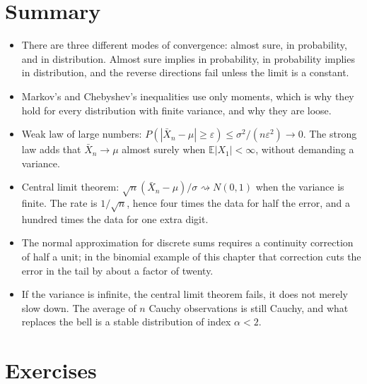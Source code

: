 \section{Summary}

\begin{ringkasan}
\begin{itemize}
  \item There are three different modes of convergence: almost sure, in probability,
        and in distribution. Almost sure implies in probability, in probability
        implies in distribution, and the reverse directions fail unless the limit is
        a constant.
  \item Markov's and Chebyshev's inequalities use only moments, which is why they
        hold for every distribution with finite variance, and why they are loose.
  \item Weak law of large numbers: $P(|\bar X_n-\mu|\ge\varepsilon)\le
        \sigma^2/(n\varepsilon^2)\to0$. The strong law adds that
        $\bar X_n\to\mu$ almost surely when $\mathbb{E}|X_1|<\infty$, without
        demanding a variance.
  \item Central limit theorem: $\sqrt n(\bar X_n-\mu)/\sigma\rightsquigarrow N(0,1)$
        when the variance is finite. The rate is $1/\sqrt n$, hence four times the
        data for half the error, and a hundred times the data for one extra digit.
  \item The normal approximation for discrete sums requires a continuity correction
        of half a unit; in the binomial example of this chapter that correction cuts
        the error in the tail by about a factor of twenty.
  \item If the variance is infinite, the central limit theorem fails, it does not
        merely slow down. The average of $n$ Cauchy observations is still Cauchy, and
        what replaces the bell is a stable distribution of index $\alpha<2$.
\end{itemize}
\end{ringkasan}

\section{Exercises}

